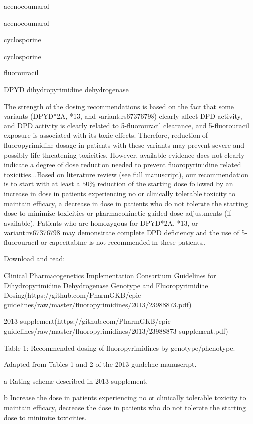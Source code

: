 \documentclass{resume} %
\begin{document}
\begin{rSection}{ acenocoumarol }
\begin{rSection}{ acenocoumarol }
\begin{rSection}{ cyclosporine }
\begin{rSection}{ cyclosporine }
\begin{rSection}{ fluorouracil }
\begin{rSubsection}{ DPYD }{ dihydropyrimidine dehydrogenase }{}{}
\item The strength of the dosing recommendations is based on the fact that some variants (DPYD*2A, *13, and variant:rs67376798) clearly affect DPD activity, and DPD activity is clearly related to 5-fluorouracil clearance, and 5-fluorouracil exposure is associated with its toxic effects. Therefore, reduction of fluoropyrimidine dosage in patients with these variants may prevent severe and possibly life-threatening toxicities. However, available evidence does not clearly indicate a degree of dose reduction needed to prevent fluoropyrimidine related toxicities...Based on literature review (see full manuscript), our recommendation is to start with at least a 50\% reduction of the starting dose followed by an increase in dose in patients experiencing no or clinically tolerable toxicity to maintain efficacy, a decrease in dose in patients who do not tolerate the starting dose to minimize toxicities or pharmacokinetic guided dose adjustments (if available). Patients who are homozygous for DPYD*2A, *13, or variant:rs67376798 may demonstrate complete DPD deficiency and the use of 5-fluorouracil or capecitabine is not recommended in these patients.,  
 \newline
\item Download and read:
 \newline
\item Clinical Pharmacogenetics Implementation Consortium Guidelines for Dihydropyrimidine Dehydrogenase Genotype and Fluoropyrimidine Dosing(https://github.com/PharmGKB/cpic-guidelines/raw/master/fluoropyrimidines/2013/23988873.pdf)
 \newline
\item 2013 supplement(https://github.com/PharmGKB/cpic-guidelines/raw/master/fluoropyrimidines/2013/23988873-supplement.pdf)
 \newline
\item Table 1: Recommended dosing of fluoropyrimidines by genotype/phenotype.
 \newline
\item Adapted from Tables 1 and 2 of the 2013 guideline manuscript.
 \newline
\item a Rating scheme described in 2013 supplement.
 \newline
\item b Increase the dose in patients experiencing no or clinically tolerable toxicity to maintain efficacy,  decrease the dose in patients who do not tolerate the starting dose to minimize toxicities.

\end{rSubsection}
\end{rSection}
\end{rSection}
\end{rSection}
\end{rSection}
\end{rSection}
\end{document}
